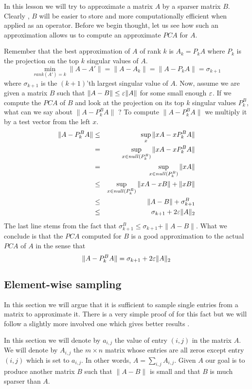 \documentclass{article}
\begin{document}


In this lesson we will try to approximate a matrix $A$ by a sparser matrix $B$. 
Clearly , $B$ will be easier to store and more computationally efficient when applied as an operator.
Before we begin thought, let us see how such an approximation allows us to compute an approximate $PCA$ for $A$.

Remember that the best approximation of $A$ of rank $k$ is $A_k = P_k A$ where $P_k$ is the projection on the top $k$ singular values of $A$. 
\[
\min_{rank(A') = k} \|A - A'\| = \|A - A_k\| = \|A - P_k A\|  = \sigma_{k+1}
\]
where $\sigma_{k+1}$ is the $(k+1)$'th largest singular value of $A$.
Now, assume we are given a matrix $B$ such that $\|A - B\| \le \varepsilon \|A\|$ for some small enough $\varepsilon$.
If we compute the $PCA$ of $B$ and look at the projection on its top $k$ singular values $P_k^B$, what can we say about $ \|A - P_k^B A\|$ ?
To compute $\|A - P_k^B A\|$ we multiply it by a test vector from the left $x$.
\begin{eqnarray}
\|A - P_k^B A\| &\le& \sup_x \|xA - xP_k^B A\| \\
&=& \sup_{x \in null (P_k^B)} \|xA - xP_k^B A\| \\
&=&\sup_{x \in null (P_k^B)} \|xA\| \\
&\le& \sup_{x \in null (P_k^B)} \|xA - xB\| + \|xB\| \\
&\le& \|A - B\| + \sigma_{k+1}^B\\
&\le& \sigma_{k+1} + 2\varepsilon\|A\|_2
\end{eqnarray}
The last line stems from the fact that $\sigma_{k+1}^B \le \sigma_{k+1} + \|A - B\|$. 
What we conclude is that the $PCA$ computed for $B$ is a good approximation to the actual $PCA$ of $A$ in the sense that
\[
\|A - P_k^B A\|  = \sigma_{k+1} + 2\varepsilon\|A\|_2
\]

\subsection*{Element-wise sampling}
In this section we will argue that it is sufficient to sample single entries from a matrix to approximate it.
There is a very simple proof of for this fact \cite{AroraHaKaFRS06} but we will follow a slightly more involved one which gives better results \cite{DrineasZouziasMatrixSampling10}.

In this section we will denote by $a_{i,j}$ the value of entry $(i,j)$ in the matrix $A$.
We will denote by $A_{i,j}$ the $m \times n$ matrix whose entries are all zeros except entry $(i,j)$ which is set to $a_{i,j}$.
In other words, $A = \sum_{i,j} A_{i,j}$. Given $A$ our goal is to produce another matrix $B$ such that $\|A - B\|$ is small and that $B$ is much sparser than $A$.
\end{document}
